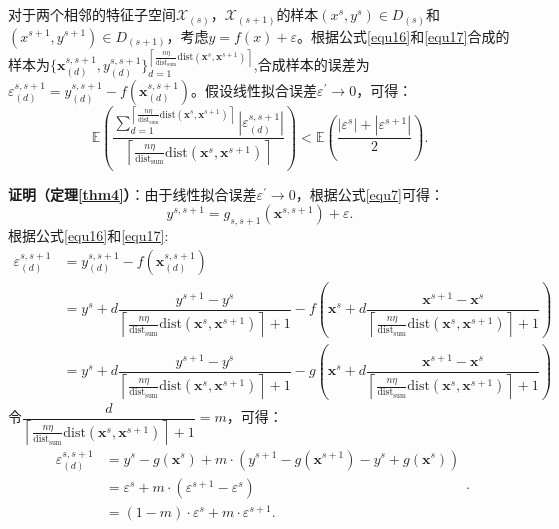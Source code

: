\documentclass{NauThesis}
\begin{document}
\begin{theorem}\label{thm4}
对于两个相邻的特征子空间$\mathcal{X}_{(s)}$，$\mathcal{X}_{(s+1)}$的样本$(x^s,y^s)\in{D}_{(s)}$和$(x^{s+1},y^{s+1})\in{D}_{(s+1)}$，考虑$y=f(x)+\varepsilon$。根据公式\eqref{equ16}和\eqref{equ17}合成的样本为$\{\boldsymbol{x}_{(d)}^{s,s+1},y_{(d)}^{s,s+1} \}_{d=1}^{\left\lceil \frac{n\eta }{\text{dist}_{\text{sum}}}\text{dist}(\boldsymbol{x}^s,\boldsymbol{x}^{s+1})\right\rceil}$,合成样本的误差为$\varepsilon^{s,s+1}_{(d)}=y_{(d)}^{s,s+1}-f(\boldsymbol{x}_{(d)}^{s,s+1})$。假设线性拟合误差$\varepsilon^\prime\rightarrow0$，可得：
$$\mathbb{E}(\frac{\textstyle\sum_{d=1}^{{\left\lceil \frac{n\eta }{\text{dist}_{\text{sum}}}\text{dist}(\boldsymbol{x}^s,\boldsymbol{x}^{s+1})\right\rceil}}{|\varepsilon^{s,s+1}_{(d)}|}}{\left\lceil \frac{n\eta }{\text{dist}_{\text{sum}}}\text{dist}(\boldsymbol{x}^s,\boldsymbol{x}^{s+1})\right\rceil})<\mathbb{E}(\frac{|\varepsilon^s|+|\varepsilon^{s+1}|}{2}).$$
\end{theorem}
\noindent \textbf{证明（定理\ref{thm4}）}：由于线性拟合误差$\varepsilon^\prime\rightarrow0$，根据公式\eqref{equ7}可得：
$$y^{s,s+1}=g_{s,s+1}(\boldsymbol{x}^{s,s+1})+\varepsilon.$$
根据公式\eqref{equ16}和\eqref{equ17}:
$$\begin{aligned}
    \varepsilon^{s,s+1}_{(d)}&=y_{(d)}^{s,s+1}-f(\boldsymbol{x}_{(d)}^{s,s+1})\\&=
    y^s+d\dfrac{y^{s+1}-y^{s}}{\left\lceil \frac{n\eta}{\text{dist}_{\text{sum}}}\text{dist}(\boldsymbol{x}^s,\boldsymbol{x}^{s+1})\right\rceil+1}-f{(\boldsymbol{x}^s+d\dfrac{\boldsymbol{x}^{s+1}-\boldsymbol{x}^{s}}{\left\lceil \frac{n\eta}{\text{dist}_{\text{sum}}}\text{dist}(\boldsymbol{x}^s,\boldsymbol{x}^{s+1})\right\rceil+1})}\\&=
    y^s+d\dfrac{y^{s+1}-y^{s}}{\left\lceil \frac{n\eta}{\text{dist}_{\text{sum}}}\text{dist}(\boldsymbol{x}^s,\boldsymbol{x}^{s+1})\right\rceil+1}-g{(\boldsymbol{x}^s+d\dfrac{\boldsymbol{x}^{s+1}-\boldsymbol{x}^{s}}{\left\lceil \frac{n\eta}{\text{dist}_{\text{sum}}}\text{dist}(\boldsymbol{x}^s,\boldsymbol{x}^{s+1})\right\rceil+1})}
    \end{aligned}$$
令$\dfrac{d}{\left\lceil \frac{n\eta}{\text{dist}_{\text{sum}}}\text{dist}(\boldsymbol{x}^s,\boldsymbol{x}^{s+1})\right\rceil+1}=m$，可得：
$$\begin{aligned}
    \varepsilon^{s,s+1}_{(d)}&=y^s-g(\boldsymbol{x}^s)+m\cdot(y^{s+1}-g(\boldsymbol{x}^{s+1})-y^s+g(\boldsymbol{x}^{s}))\\&=
    \varepsilon^s+m\cdot(\varepsilon^{s+1}-\varepsilon^s)\\&=
    (1-m)\cdot\varepsilon^s+m\cdot\varepsilon^{s+1}.
    \end{aligned}.$$
\end{document}
